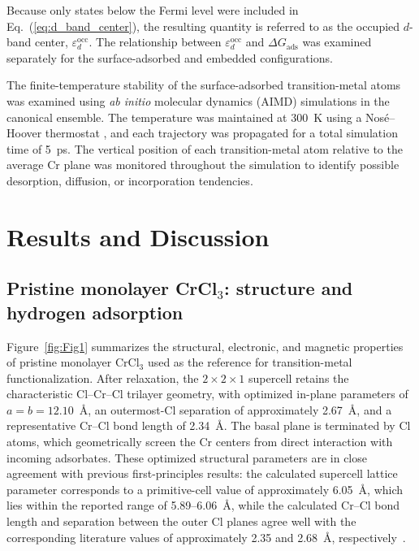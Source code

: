 \documentclass[journal=jacsat,manuscript=article]{achemso}
\begin{document}
Because only states below the Fermi level were included in Eq.~(\ref{eq:d_band_center}), the resulting quantity is referred to as the occupied $d$-band center, $\varepsilon_{d}^{\mathrm{occ}}$. The relationship between $\varepsilon_{d}^{\mathrm{occ}}$ and $\Delta G_{\mathrm{ads}}$ was examined separately for the surface-adsorbed and embedded configurations.

The finite-temperature stability of the surface-adsorbed transition-metal atoms was examined using \textit{ab initio} molecular dynamics (AIMD) simulations in the canonical ensemble. The temperature was maintained at 300~K using a Nosé--Hoover thermostat \cite{Nose1984,Hoover1985}, and each trajectory was propagated for a total simulation time of 5~ps. The vertical position of each transition-metal atom relative to the average Cr plane was monitored throughout the simulation to identify possible desorption, diffusion, or incorporation tendencies.

\section{Results and Discussion}

\subsection{Pristine monolayer CrCl$_3$: structure and hydrogen adsorption}

\noindent Figure~\ref{fig:Fig1} summarizes the structural, electronic, and magnetic properties of pristine monolayer CrCl$_3$ used as the reference for transition-metal functionalization. After relaxation, the $2\times2 \times 1$ supercell retains the characteristic Cl--Cr--Cl trilayer geometry, with optimized in-plane parameters of $a=b=12.10$~\AA, an outermost-Cl separation of approximately 2.67~\AA, and a representative Cr--Cl bond length of 2.34~\AA. The basal plane is terminated by Cl atoms, which geometrically screen the Cr centers from direct interaction with incoming adsorbates. These optimized structural parameters are in close agreement with previous first-principles results: the calculated supercell lattice parameter corresponds to a primitive-cell value of approximately 6.05~\AA, which lies within the reported range of 5.89--6.06~\AA, while the calculated Cr--Cl bond length and separation between the outer Cl planes agree well with the corresponding literature values of approximately 2.35 and 2.68~\AA, respectively~\cite{Webster2018,Gao2018,Mastrippolito2022,Zala2024}.
\end{document}

